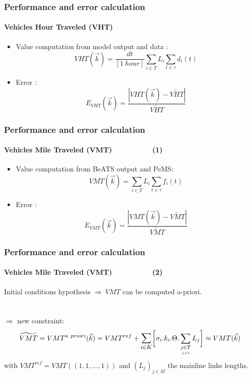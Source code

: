 \documentclass[fleqn]{beamer}
\begin{document}
\begin{frame}
	\frametitle{Performance and error calculation}
	\framesubtitle{Vehicles Hour Traveled (VHT)}
	\begin{itemize}
		\item Value computation from model output and data : 
		\begin{equation*}
				 VHT(\vec{k})=\frac{dt}{[1\ hour]}\sum_{i\in{T}}L_{i}\sum_{t\in \tau}d_{i}(t)
		\end{equation*}
		\item Error : 
		\begin{equation*}
			E_{VHT}(\vec{k})=\frac{|VHT(\vec{k})-\widetilde{VHT}|}{\widetilde{VHT}}
		\end{equation*}
	\end{itemize}
\end{frame}

\begin{frame}
	\frametitle{Performance and error calculation}
	\framesubtitle{Vehicles Mile Traveled (VMT)~~~~~~~~~~(1)}
	\begin{itemize}
		\item Value computation from BeATS output and PeMS: 
		\begin{equation*}
			 VMT(\vec{k})=\sum_{i\in{T}}L_{i}\sum_{t\in \tau}f_{i}(t)
		\end{equation*}
		\item Error : 
		\begin{equation*}
			E_{VMT}(\vec{k})=\frac{|VMT(\vec{k})-\widetilde{VMT}|}{\widetilde{VMT}}
		\end{equation*}
 	\end{itemize}
\end{frame}


\begin{frame}
	\frametitle{Performance and error calculation}
	\framesubtitle{Vehicles Mile Traveled (VMT)~~~~~~~~~~(2)}
		Initial conditions hypothesis $\Rightarrow\ VMT$ can be computed a-priori.\\
		~\\
		~\\
		$\Rightarrow$ new constraint:
		\begin{equation*}
		\widetilde{VMT}=VMT^{a\ priori}(\vec{k})=VMT^{ref}+\mathlarger{\sum\limits_{i\in K}}\biggl[\sigma_{i}.k_{i}.\Theta.	\sum\limits_{\underset{j>i}{j\in T}}L_{j}\biggr]\approx VMT(\vec{k})
		\end{equation*}
		with $VMT^{ref}=VMT((1,1,...,1))$ and $(L_{j})_{j\in M}$ the mainline links lengths.
\end{frame}
\end{document}
